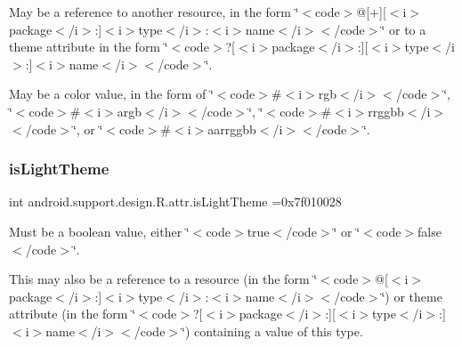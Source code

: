 May be a reference to another resource, in the form \char`\"{}$<$code$>$@\mbox{[}+\mbox{]}\mbox{[}$<$i$>$package$<$/i$>$\+:\mbox{]}$<$i$>$type$<$/i$>$\+:$<$i$>$name$<$/i$>$$<$/code$>$\char`\"{} or to a theme attribute in the form \char`\"{}$<$code$>$?\mbox{[}$<$i$>$package$<$/i$>$\+:\mbox{]}\mbox{[}$<$i$>$type$<$/i$>$\+:\mbox{]}$<$i$>$name$<$/i$>$$<$/code$>$\char`\"{}. 

May be a color value, in the form of \char`\"{}$<$code$>$\#$<$i$>$rgb$<$/i$>$$<$/code$>$\char`\"{}, \char`\"{}$<$code$>$\#$<$i$>$argb$<$/i$>$$<$/code$>$\char`\"{}, \char`\"{}$<$code$>$\#$<$i$>$rrggbb$<$/i$>$$<$/code$>$\char`\"{}, or \char`\"{}$<$code$>$\#$<$i$>$aarrggbb$<$/i$>$$<$/code$>$\char`\"{}. \mbox{\label{classandroid_1_1support_1_1design_1_1R_1_1attr_a2a6cc275e16983cd04955a6776ca5cd6}} 
\subsubsection{\texorpdfstring{is\+Light\+Theme}{isLightTheme}}
{\footnotesize\ttfamily int android.\+support.\+design.\+R.\+attr.\+is\+Light\+Theme =0x7f010028\hspace{0.3cm}{\ttfamily [static]}}

Must be a boolean value, either \char`\"{}$<$code$>$true$<$/code$>$\char`\"{} or \char`\"{}$<$code$>$false$<$/code$>$\char`\"{}. 

This may also be a reference to a resource (in the form \char`\"{}$<$code$>$@\mbox{[}$<$i$>$package$<$/i$>$\+:\mbox{]}$<$i$>$type$<$/i$>$\+:$<$i$>$name$<$/i$>$$<$/code$>$\char`\"{}) or theme attribute (in the form \char`\"{}$<$code$>$?\mbox{[}$<$i$>$package$<$/i$>$\+:\mbox{]}\mbox{[}$<$i$>$type$<$/i$>$\+:\mbox{]}$<$i$>$name$<$/i$>$$<$/code$>$\char`\"{}) containing a value of this type. \mbox{\label{classandroid_1_1support_1_1design_1_1R_1_1attr_a175ad4ea5ea9131efdf6e243d576e059}} 
